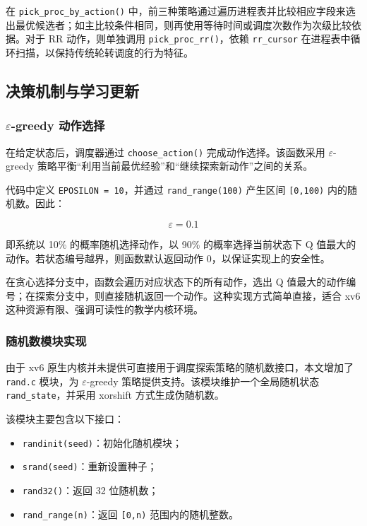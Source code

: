 在 \texttt{pick\_proc\_by\_action()} 中，前三种策略通过遍历进程表并比较相应字段来选出最优候选者；如主比较条件相同，则再使用等待时间或调度次数作为次级比较依据。对于 RR 动作，则单独调用 \texttt{pick\_proc\_rr()}，依赖 \texttt{rr\_cursor} 在进程表中循环扫描，以保持传统轮转调度的行为特征。

\subsection{决策机制与学习更新}

\subsubsection{$\varepsilon$-greedy 动作选择}

在给定状态后，调度器通过 \texttt{choose\_action()} 完成动作选择。该函数采用 $\varepsilon$-greedy 策略平衡“利用当前最优经验”和“继续探索新动作”之间的关系。

代码中定义 \texttt{EPOSILON = 10}，并通过 \texttt{rand\_range(100)} 产生区间 \texttt{[0,100)} 内的随机数。因此：

\begin{equation}
\varepsilon = 0.1
\end{equation}

即系统以 10\% 的概率随机选择动作，以 90\% 的概率选择当前状态下 Q 值最大的动作。若状态编号越界，则函数默认返回动作 0，以保证实现上的安全性。

在贪心选择分支中，函数会遍历对应状态下的所有动作，选出 Q 值最大的动作编号；在探索分支中，则直接随机返回一个动作。这种实现方式简单直接，适合 xv6 这种资源有限、强调可读性的教学内核环境。

\subsubsection{随机数模块实现}

由于 xv6 原生内核并未提供可直接用于调度探索策略的随机数接口，本文增加了 \texttt{rand.c} 模块，为 $\varepsilon$-greedy 策略提供支持。该模块维护一个全局随机状态 \texttt{rand\_state}，并采用 xorshift 方式生成伪随机数。

该模块主要包含以下接口：

\begin{itemize}
\item \texttt{randinit(seed)}：初始化随机模块；
\item \texttt{srand(seed)}：重新设置种子；
\item \texttt{rand32()}：返回 32 位随机数；
\item \texttt{rand\_range(n)}：返回 \texttt{[0,n)} 范围内的随机整数。
\end{itemize}

